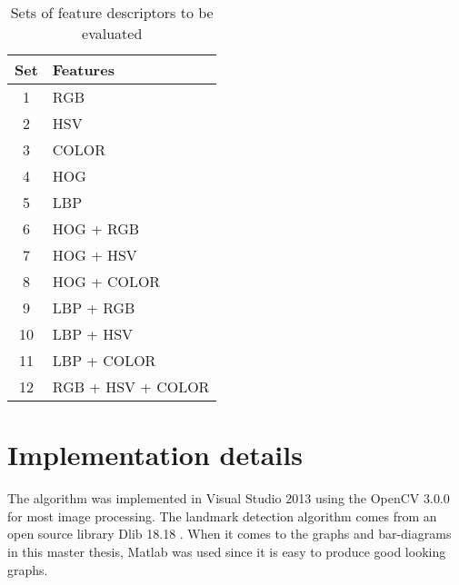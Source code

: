\FloatBarrier
\begin{table}[h!]
	\begin{center}
		\caption{Sets of feature descriptors to be evaluated}
		\begin{tabular}{|c|l|}
			\hline
			Set &  Features   \\ \hline
			 1  &     RGB     \\ \hline
			 2  &     HSV     \\ \hline
			 3  &    COLOR    \\ \hline
			 4  &     HOG     \\ \hline
			 5  &     LBP     \\ \hline
			 6  &  HOG + RGB  \\ \hline
			 7  &  HOG + HSV  \\ \hline
			 8  & HOG + COLOR \\ \hline
			 9  &  LBP + RGB  \\ \hline
			 10  &  LBP + HSV  \\ \hline
			 11  & LBP + COLOR \\ \hline
			 12  & RGB + HSV + COLOR \\ \hline
		\end{tabular}
		\label{table:feature_sets}
	\end{center}
\end{table}
\FloatBarrier

\section{Implementation details}

The algorithm was implemented in Visual Studio 2013 using the OpenCV 3.0.0 \cite{opencv} for most image processing. The landmark detection algorithm comes from an open source library Dlib 18.18 \cite{dlib09}. When it comes to the graphs and bar-diagrams in this master thesis, Matlab \cite{MATLAB:2010} was used since it is easy to produce good looking graphs.  































